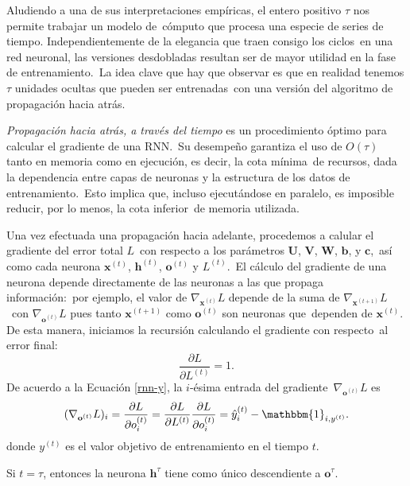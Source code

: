 \noindent
Aludiendo a una de sus interpretaciones empíricas, el entero positivo $\tau$ nos permite trabajar un modelo de\
cómputo que procesa una especie de series de tiempo. Independientemente de la elegancia que traen consigo los ciclos\
en una red neuronal, las versiones desdobladas resultan ser de mayor utilidad en la fase de entrenamiento.\
La idea clave que hay que observar es que en realidad tenemos $\tau$ unidades ocultas que pueden ser entrenadas\
con una versión del algoritmo de propagación hacia atrás.\par
\emph{Propagación hacia atrás, a través del tiempo} es un procedimiento óptimo para calcular el gradiente de una RNN.\
Su desempeño garantiza el uso de $O(\tau)$ tanto en memoria como en ejecución, es decir, la cota mínima\
de recursos, dada la dependencia entre capas de neuronas y la estructura de los datos de entrenamiento.\
Esto implica que, incluso ejecutándose en paralelo, es imposible reducir, por lo menos, la cota inferior\
de memoria utilizada.\par
Una vez efectuada una propagación hacia adelante, procedemos a calular el gradiente del error total $L$\
con respecto a los parámetros $\mathbf{U}$, $\mathbf{V}$, $\mathbf{W}$, $\mathbf{b}$, y $\mathbf{c}$,\
así como cada neurona $\mathbf{x}^{(t)}$, $\mathbf{h}^{(t)}$, $\mathbf{o}^{(t)}$ y $L^{(t)}$.\
El cálculo del gradiente de una neurona depende directamente de las neuronas a las que propaga información:\
por ejemplo, el valor de $\nabla_{\mathbf{x}^{(t)}}L$ depende de la suma de $\nabla_{\mathbf{x}^{(t+1)}}L$\
con $\nabla_{\mathbf{o}^{(t)}}L$ pues tanto $\mathbf{x}^{(t+1)}$ como $\mathbf{o}^{(t)}$ son neuronas que\
dependen de $\mathbf{x}^{(t)}$. De esta manera, iniciamos la recursión calculando el gradiente con respecto\
al error final:
\begin{equation}
  \frac{\partial L}{\partial L^{(t)}} = 1.
\end{equation}
De acuerdo a la Ecuación \ref{rnn-y}, la $i$-ésima entrada del gradiente\
$\nabla_{\mathbf{o}^{(t)}}L$ es
\begin{equation}
  (\nabla_{\mathbf{o}^{(t)}}L)_i = \frac{\partial L}{\partial o_i^{(t)}} =
  \frac{\partial L}{\partial L^{(t)}} \frac{\partial L}{\partial o_i^{(t)}} =
  \hat{y}_i^{(t)} - \mathbbm{1}_{i, y^{(t)}}.
\end{equation}
donde $y^{(t)}$ es el valor objetivo de entrenamiento en el tiempo $t$.\par
Si $t = \tau$, entonces la neurona $\mathbf{h}^{\tau}$ tiene como único descendiente a $\mathbf{o}^{\tau}$.\
